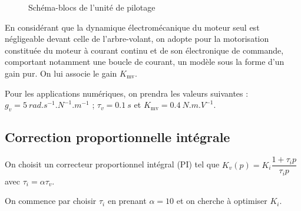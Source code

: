 \begin{multicols}{2}
\begin{figure}[H]
\caption{Schéma-blocs de l'unité de pilotage  \label{fig_11}}
\end{figure}

En considérant que la dynamique électromécanique du moteur seul est négligeable devant celle de
l'arbre-volant, on adopte pour la motorisation constituée du moteur à courant continu et de son
électronique de commande, comportant notamment une boucle de courant, un modèle sous la forme
d'un gain pur. On lui associe le gain $K_{\text{mv}}$.

Pour les applications numériques, on prendra les valeurs suivantes :
$g_v=\SI{5}{rad.s^{-1}.N^{-1}.m^{-1}}$ ; $\tau_v = \SI{0,1}{s}$ et $K_{\text{mv}} = \SI{0,4}{N.m.V^{-1}}$.

\subsection*{Correction proportionnelle intégrale}

On choisit un correcteur proportionnel intégral (PI) tel que $K_v(p)=K_i \dfrac{1+\tau_i p}{\tau_i p}$
avec $\tau_i =\alpha \tau_v$.



\ifprof
\begin{corrige}
\end{corrige}
\else
\fi


\ifprof
\begin{corrige}
\end{corrige}
\else
\fi

On commence par choisir $\tau_i$ en prenant $\alpha=10$ et on cherche à optimiser $K_i$.



\end{multicols}
